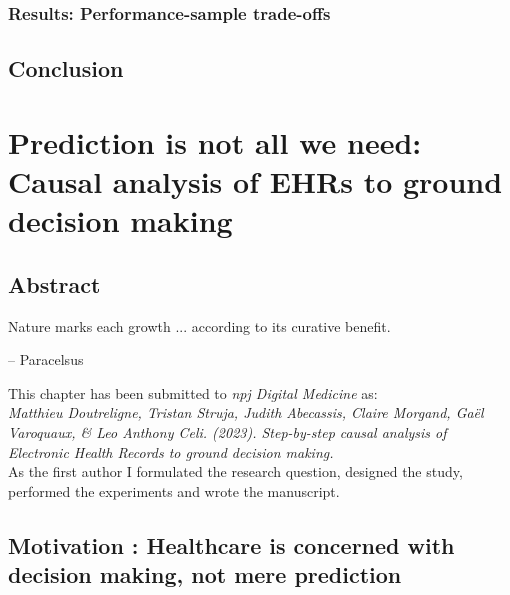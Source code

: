 \documentclass[french,12pt,twoside,a4paper]{book}
\newenvironment{citationbox}{
  \begin{tcolorbox}[
      enhanced,
      colback=gray!10, %
      colframe=white, %
      arc=0mm, %
      boxrule=0.5pt, %
      rightrule=0pt, %
      left=0pt, %
      right=0pt, %
      top=0pt, %
      bottom=0pt, %
      rightupper=0mm, %
      rightlower=0mm, %
      width=0.9\textwidth,
      flush right,
      ]
    \footnotesize %
    \itshape %
    }{
  \end{tcolorbox}%
}
\begin{document}
\subsection{Results: Performance-sample trade-offs}

\section{Conclusion}\label{sec:predictive_models:conclusion}

\chapter{Prediction is not all we need: Causal analysis of EHRs to ground decision making}\label{chapter:causal_tuto}
\section{Abstract}\label{sec:causal_tuto:abstract}

\begin{citationbox}
  Nature marks each growth ... according to its curative benefit.
  \par\hfill -- Paracelsus
\end{citationbox}

\vfill
This chapter has been submitted to \textit{npj Digital Medicine} as:\\
\textit{Matthieu Doutreligne, Tristan Struja, Judith Abecassis, Claire Morgand, Gaël
  Varoquaux, \& Leo Anthony Celi. (2023). Step-by-step causal analysis of Electronic Health Records to ground
  decision making.} \\
As the first author I formulated the research question, designed the study,
performed the experiments and wrote the manuscript.

\clearpage
\section{Motivation : Healthcare is concerned with decision making, not mere
  prediction}%
\label{sec:causal_tuto:motivation}%
\end{document}

